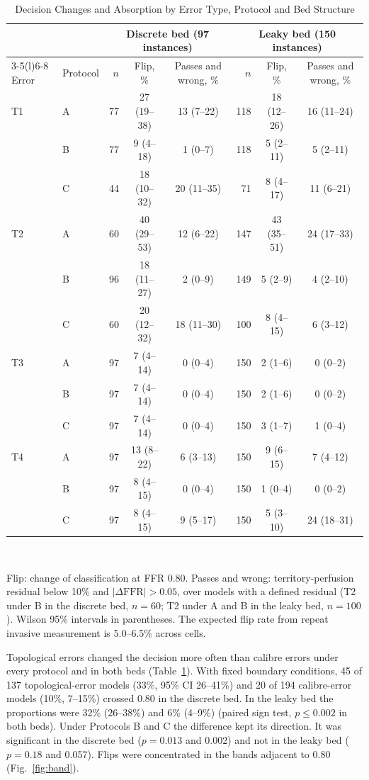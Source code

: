 \documentclass[journal]{IEEEtran}
\begin{document}
\begin{table}[!t]
\caption{Decision Changes and Absorption by Error Type, Protocol and Bed Structure}
\label{tab:results}
\centering\footnotesize
\begin{tabular}{@{}llrccrcc@{}}
\toprule
 & & \multicolumn{3}{c}{Discrete bed (97 instances)} & \multicolumn{3}{c}{Leaky bed (150 instances)}\\
\cmidrule(lr){3-5}\cmidrule(l){6-8}
Error & Protocol & $n$ & Flip, \% & Passes and wrong, \% & $n$ & Flip, \% & Passes and wrong, \%\\
\midrule
T1 & A & 77 & 27 (19--38) & 13 (7--22) & 118 & 18 (12--26) & 16 (11--24) \\
 & B & 77 & 9 (4--18) & 1 (0--7) & 118 & 5 (2--11) & 5 (2--11) \\
 & C & 44 & 18 (10--32) & 20 (11--35) & 71 & 8 (4--17) & 11 (6--21) \\
\addlinespace[2pt]
T2 & A & 60 & 40 (29--53) & 12 (6--22) & 147 & 43 (35--51) & 24 (17--33) \\
 & B & 96 & 18 (11--27) & 2 (0--9) & 149 & 5 (2--9) & 4 (2--10) \\
 & C & 60 & 20 (12--32) & 18 (11--30) & 100 & 8 (4--15) & 6 (3--12) \\
\addlinespace[2pt]
T3 & A & 97 & 7 (4--14) & 0 (0--4) & 150 & 2 (1--6) & 0 (0--2) \\
 & B & 97 & 7 (4--14) & 0 (0--4) & 150 & 2 (1--6) & 0 (0--2) \\
 & C & 97 & 7 (4--14) & 0 (0--4) & 150 & 3 (1--7) & 1 (0--4) \\
\addlinespace[2pt]
T4 & A & 97 & 13 (8--22) & 6 (3--13) & 150 & 9 (6--15) & 7 (4--12) \\
 & B & 97 & 8 (4--15) & 0 (0--4) & 150 & 1 (0--4) & 0 (0--2) \\
 & C & 97 & 8 (4--15) & 9 (5--17) & 150 & 5 (3--10) & 24 (18--31) \\
\bottomrule
\end{tabular}
\\[2pt]
\parbox{\textwidth}{\footnotesize Flip: change of classification at FFR 0.80. Passes and wrong: territory-perfusion
residual below 10\% and $|\Delta\mathrm{FFR}| > 0.05$, over models with a defined residual (T2 under B in the discrete
bed, $n = 60$; T2 under A and B in the leaky bed, $n = 100$). Wilson 95\% intervals in parentheses. The expected flip
rate from repeat invasive measurement is 5.0--6.5\% across cells.}
\end{table}

Topological errors changed the decision more often than calibre errors under every protocol and in both beds
(Table~\ref{tab:results}). With fixed boundary conditions, 45 of 137 topological-error models (33\%, 95\% CI
26--41\%) and 20 of 194 calibre-error models (10\%, 7--15\%) crossed 0.80 in the discrete bed. In the leaky bed the
proportions were 32\% (26--38\%) and 6\% (4--9\%) (paired sign test, $p \leq 0.002$ in both beds). Under
Protocols B and C the difference kept its direction. It was significant in the discrete bed ($p = 0.013$ and
0.002) and not in the leaky bed ($p = 0.18$ and 0.057). Flips were concentrated in the bands
adjacent to 0.80 (Fig.~\ref{fig:band}).
\end{document}
